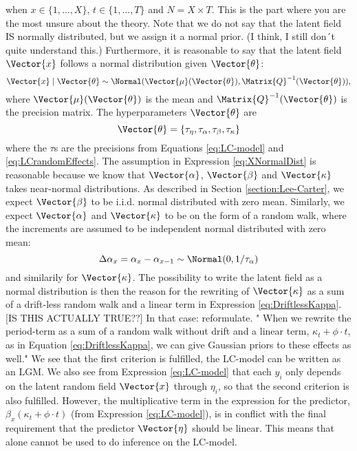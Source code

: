 when $x\in \{1,\ldots,X\}$, $t\in\{1,\ldots,T\}$ and $N=X\times T$. \textcolor{myDarkGreen}{This is the part where you are the most unsure about the theory. Note that we do not say that the latent field IS normally distributed, but we assign it a normal prior. (I think, I still don´t quite understand this.)}
Furthermore, it is reasonable to say that the latent field $\Vector{x}$ follows a normal distribution given $\Vector{\theta}$:
\begin{equation}
        \Vector{x}\mid \Vector{\theta} \sim \Normal(\Vector{\mu}(\Vector{\theta}), \Matrix{Q}^{-1}(\Vector{\theta})),
        \label{eq:XNormalDist}
\end{equation}
where $\Vector{\mu}(\Vector{\theta})$ is the mean and $\Matrix{Q}^{-1}(\Vector{\theta})$ is the precision matrix. The hyperparameters $\Vector{\theta}$ are
\begin{equation}
    \Vector{\theta} = \{\tau_{\eta}, \tau_{\alpha}, \tau_{\beta}, \tau_{\kappa}\}
    \label{eq:LChyperparams}
\end{equation}
where the $\tau$s are the precisions from Equations \ref{eq:LC-model} and \ref{eq:LCrandomEffects}. The assumption in Expression \ref{eq:XNormalDist} is reasonable because we know that $\Vector{\alpha}$, $\Vector{\beta}$ and $\Vector{\kappa}$ takes near-normal distributions. As described in Section \ref{section:Lee-Carter}, we expect $\Vector{\beta}$ to be i.i.d. normal distributed with zero mean. Similarly, we expect $\Vector{\alpha}$ and $\Vector{\kappa}$ to be on the form of a random walk, where the increments are assumed to be independent normal distributed with zero mean: 
\begin{equation*}
    \Delta \alpha_x = \alpha_x - \alpha_{x-1} \sim \Normal(0, 1/\tau_{\alpha})
\end{equation*}
and similarily for $\Vector{\kappa}$. The possibility to write the latent field as a normal distribution is then the reason for the rewriting of $\Vector{\kappa}$ as a sum of a drift-less random walk and a linear term in Expression \ref{eq:DriftlessKappa}.\textcolor{myDarkGreen}{[IS THIS ACTUALLY TRUE??] In that case: reformulate. " When we rewrite the period-term as a sum of a random walk without drift and a linear term, $\kappa_t + \phi\cdot t$, as in Equation \ref{eq:DriftlessKappa}, we can give Gaussian priors to these effects as well."} 
\newline
We see that the first criterion is fulfilled, the LC-model can be written as an LGM. We also see from Expression \ref{eq:LC-model} that each $y_i$ only depends on the latent random field $\Vector{x}$ through $\eta_i$, so that the second criterion is also fulfilled. However, the multiplicative term in the expression for the predictor, $\beta_x(\kappa_t + \phi\cdot t)$ (from Expression \ref{eq:LC-model}), is in conflict with the final requirement that the predictor $\Vector{\eta}$ should be linear. This means that \inla alone cannot be used to do inference on the LC-model. 
   
